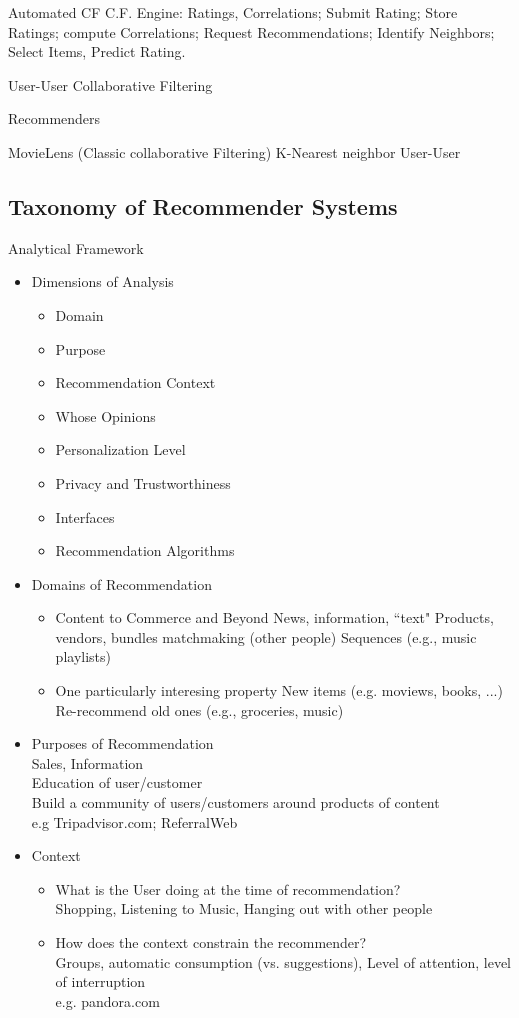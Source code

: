 \documentclass[fleqn,twoside]{article}
\begin{document}
Automated CF
C.F. Engine:  Ratings, Correlations;
Submit Rating;
Store Ratings;
compute Correlations;
Request Recommendations;
Identify Neighbors;
Select Items, Predict Rating.


User-User Collaborative Filtering

Recommenders

MovieLens  (Classic collaborative Filtering)
K-Nearest neighbor User-User


\subsection{Taxonomy of Recommender Systems}
Analytical Framework
\begin{itemize}
\item Dimensions of Analysis
	\begin{itemize}
	  \item Domain
	  \item Purpose
	  \item Recommendation Context
	  \item Whose Opinions
	  \item Personalization Level
	  \item Privacy and Trustworthiness
	  \item Interfaces
	  \item Recommendation Algorithms
	\end{itemize}
\item Domains of Recommendation
	 \begin{itemize}
	 \item Content to Commerce and Beyond
	    News, information, 	``text"
	   Products, vendors, bundles
		matchmaking (other people)
		Sequences (e.g., music playlists)
	\item One particularly interesing property
	  New items (e.g. moviews, books, ...)
	  Re-recommend old ones (e.g., groceries, music)
 	\end{itemize}

\item Purposes of Recommendation  \\
	Sales, Information \\
	Education of user/customer \\
	Build a community of users/customers around products of content \\
	e.g Tripadvisor.com; ReferralWeb

\item Context
	\begin{itemize}
		\item What is the User doing at the time of recommendation? \\
				Shopping, Listening to Music,  Hanging out with other people
		\item How does the context constrain the recommender?\\
			Groups, automatic consumption (vs. suggestions), Level of attention, level of interruption \\
			e.g.  pandora.com


\end{itemize}
\end{itemize}
\end{document}
